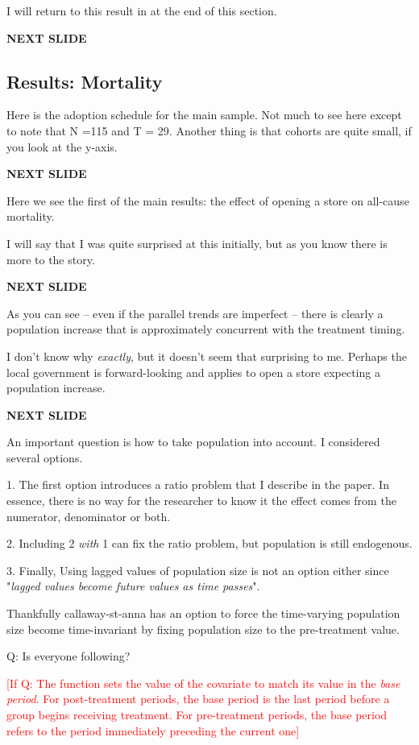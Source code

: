 \documentclass[12pt]{article}
\newcommand{\TODO}[1]{\textcolor{red}{[#1]}}
\begin{document}
I will return to this result in at the end of this section.

\textbf{NEXT SLIDE}

\subsection{Results: Mortality} 

Here is the adoption schedule for the main sample. Not much to see here except to note that N =115 and T = 29. Another thing is that cohorts are quite small, if you look at the y-axis.

\textbf{NEXT SLIDE}

Here we see the first of the main results: the effect of opening a store on all-cause mortality. 

I will say that I was quite surprised at this initially, but as you know there is more to the story. 

\textbf{NEXT SLIDE}

As you can see -- even if the parallel trends are imperfect -- there is clearly a population increase that is approximately concurrent with the treatment timing. 

I don't know why \emph{exactly}, but it doesn't seem that surprising to me. Perhaps the local government is forward-looking and applies to open a store expecting a population increase.

\textbf{NEXT SLIDE}

An important question is how to take population into account. I considered several options. 

1. The first option introduces a ratio problem that I describe in the paper. In essence, there is no way for the researcher to know it the effect comes from the numerator, denominator or both. 

2. Including 2 \emph{with} 1 can fix the ratio problem, but population is still endogenous. 

3. Finally, Using lagged values of population size is not an option either since "\emph{lagged values become future values as time passes}".

Thankfully callaway-st-anna has an option to force the time-varying population size become time-invariant by fixing population size to the pre-treatment value. 

Q: Is everyone following?



\TODO{If Q: The function sets the value of the covariate to match its value in the \emph{base period}. For post-treatment periods, the base period is the last period before a group begins receiving treatment. For pre-treatment periods, the base period refers to the period immediately preceding the current one}
\end{document}
